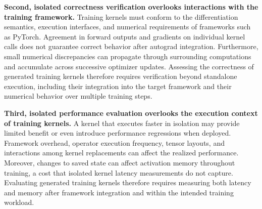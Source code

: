 \textbf{Second, isolated correctness verification overlooks interactions with the training framework.} Training kernels must conform to the differentiation semantics, execution interfaces, and numerical requirements of frameworks such as PyTorch. Agreement in forward outputs and gradients on individual kernel calls does not guarantee correct behavior after autograd integration. Furthermore, small numerical discrepancies can propagate through surrounding computations and accumulate across successive optimizer updates. Assessing the correctness of generated training kernels therefore requires verification beyond standalone execution, including their integration into the target framework and their numerical behavior over multiple training steps.

\textbf{Third, isolated performance evaluation overlooks the execution context of training kernels. }A kernel that executes faster in isolation may provide limited benefit or even introduce performance regressions when deployed. Framework overhead, operator execution frequency, tensor layouts, and interactions among kernel replacements can affect the realized performance. Moreover, changes to saved state can affect activation memory throughout training, a cost that isolated kernel latency measurements do not capture. Evaluating generated training kernels therefore requires measuring both latency and memory after framework integration and within the intended training workload.

